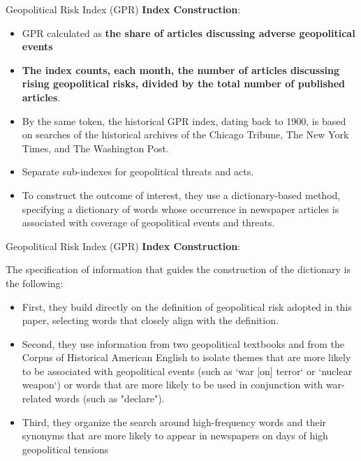 \documentclass[11pt]{beamer}
\newcommand{\hly}[1]{\colorbox{yellow!100}{#1}}
\begin{document}
\begin{frame}{Geopolitical Risk Index (GPR)}
\textbf{Index Construction}:

	\begin{itemize}
		\item GPR calculated as \textbf{the share of articles discussing adverse geopolitical events}

		\item \textbf{The index counts, each month, the number of articles discussing rising geopolitical risks, divided by the total number of published articles}.

		\item By the same token, the historical GPR index, dating back to 1900, is based on searches of the historical archives of the Chicago Tribune, The New York Times, and The Washington Post.

		\item Separate sub-indexes for geopolitical threats and acts.

		\item To construct the outcome of interest, they use a \hly{dictionary-based method}, specifying a dictionary of words whose occurrence in newspaper articles is associated with coverage of geopolitical events and threats.
	\end{itemize}
\end{frame}
\begin{frame}{Geopolitical Risk Index (GPR)}
\textbf{Index Construction}:

The specification of information that guides the construction of the dictionary is the following:

	\begin{itemize}
		\item First, they build directly on the \hly{definition of geopolitical risk} adopted in this paper, selecting words that closely align with the definition. 

		\item Second, they use information from two geopolitical textbooks and from the Corpus of Historical American English to isolate themes that are more likely to be associated with geopolitical events (such as `war [on] terror` or `nuclear weapon`) or words that are more likely to be used in conjunction with war-related words (such as "declare"). 

		\item Third, they organize the search around \hly{high-frequency words} and their synonyms that are more likely to appear in newspapers on days of high geopolitical tensions
	\end{itemize}
\end{frame}
\end{document}
